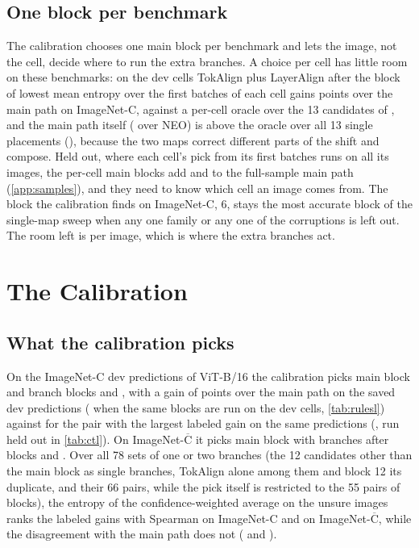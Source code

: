 \documentclass{article}
\newcommand{\tok}{TokAlign}
\newcommand{\layer}{LayerAlign}
\newcommand{\neo}{NEO}
\begin{document}
\subsection{One block per benchmark}
\label{app:percell}
The calibration chooses one main block per benchmark and lets the image, not the cell, decide where to run the extra branches. A choice per cell has little room on these benchmarks: on the dev cells \tok{} plus \layer{} after the block of lowest mean entropy over the first  batches of each cell gains  points over the main path on ImageNet-C, against a per-cell oracle over the 13 candidates of , and the main path itself ( over \neo{}) is above the oracle over all 13 single placements (), because the two maps correct different parts of the shift and compose. Held out, where each cell's pick from its first batches runs on all its images, the per-cell main blocks add  and  to the full-sample main path (\cref{app:samples}), and they need to know which cell an image comes from. The block the calibration finds on ImageNet-C, 6, stays the most accurate block of the single-map sweep when any one family or any one of the  corruptions is left out. The room left is per image, which is where the extra branches act.

\section{The Calibration}
\label{app:calib}
\subsection{What the calibration picks}
On the ImageNet-C dev predictions of ViT-B/16 the calibration picks main block  and branch blocks  and , with a gain of  points over the main path on the saved dev predictions ( when the same blocks are run on the dev cells, \cref{tab:rulesl}) against  for the pair with the largest labeled gain on the same predictions (, run held out in \cref{tab:ctl}). On ImageNet-$\overline{\text{C}}$ it picks main block  with branches after blocks  and . Over all 78 sets of one or two branches (the 12 candidates other than the main block as single branches, \tok{} alone among them and block 12 its duplicate, and their 66 pairs, while the pick itself is restricted to the 55 pairs of blocks), the entropy of the confidence-weighted average on the unsure images ranks the labeled gains with Spearman  on ImageNet-C and  on ImageNet-$\overline{\text{C}}$, while the disagreement with the main path does not ( and ).
\end{document}
